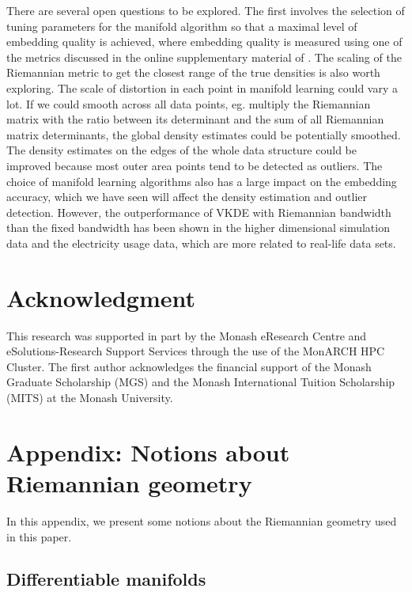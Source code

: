 \documentclass[11pt,a4paper,]{article}
\begin{document}
There are several open questions to be explored. The first involves the selection of tuning parameters for the manifold algorithm so that a maximal level of embedding quality is achieved, where embedding quality is measured using one of the metrics discussed in the online supplementary material of \textcite{Cheng2021-ex}. The scaling of the Riemannian metric to get the closest range of the true densities is also worth exploring. The scale of distortion in each point in manifold learning could vary a lot. If we could smooth across all data points, eg. multiply the Riemannian matrix with the ratio between its determinant
and the sum of all Riemannian matrix determinants, the global density estimates could be potentially smoothed. The density estimates on the edges of the whole data structure could be improved because most outer area points tend to be detected as outliers. The choice of manifold learning algorithms also has a large impact on the embedding accuracy, which we have seen will affect the density estimation and outlier detection. However, the outperformance of VKDE with Riemannian bandwidth than the fixed bandwidth has been shown in the higher dimensional simulation data and the electricity usage data, which are more related
to real-life data sets.

\hypertarget{acknowledgment}{%
\section*{Acknowledgment}\label{acknowledgment}}

This research was supported in part by the Monash eResearch Centre and eSolutions-Research Support Services through the use of the MonARCH HPC Cluster. The first author acknowledges the financial support of the Monash Graduate Scholarship (MGS) and the Monash International Tuition Scholarship (MITS) at the Monash University.

\appendix

\hypertarget{riemgeo}{%
\section{Appendix: Notions about Riemannian geometry}\label{riemgeo}}

In this appendix, we present some notions about the Riemannian geometry used in this paper.

\hypertarget{differentiable-manifolds}{%
\subsection{Differentiable manifolds}\label{differentiable-manifolds}}
\end{document}
